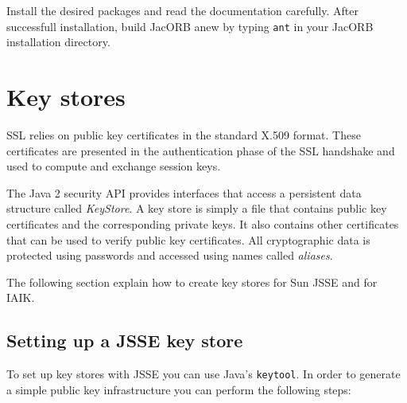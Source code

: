 Install the desired packages and read the documentation carefully. After
successfull installation, build JacORB anew by typing {\tt ant} in your JacORB
installation directory.


\section{Key stores}

SSL  relies   on  public  key  certificates  in   the  standard  X.509
format. These  certificates are presented in  the authentication phase
of the  SSL handshake and used  to compute and  exchange session keys.

The Java 2  security API provides interfaces that  access a persistent
data structure  called {\em  KeyStore}. A key  store is simply  a file
that contains  public key  certificates and the  corresponding private
keys. It also  contains other certificates that can  be used to verify
public key  certificates.  All  cryptographic data is  protected using
passwords and accessed using names called {\em aliases}.

The following section explain how to create key stores for Sun JSSE
and for IAIK.


\subsection{Setting up a JSSE key store}

To set up key stores with JSSE you can use Java's {\tt keytool}.
In  order to  generate  a  simple public  key  infrastructure you  can
perform the following steps:

